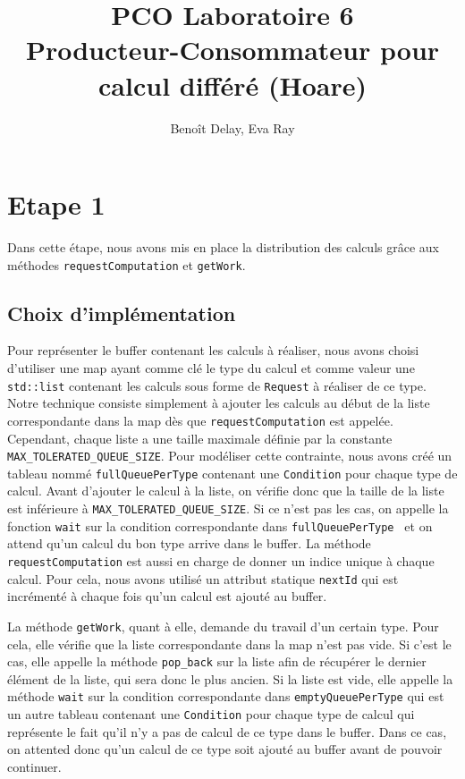 \documentclass{article}
\title{PCO Laboratoire 6 \\
\large Producteur-Consommateur pour calcul différé (Hoare)}
\author{Benoît Delay, Eva Ray}
\begin{document}
\maketitle

\section{Etape 1}
Dans cette étape, nous avons mis en place la distribution des calculs grâce aux méthodes \texttt{requestComputation} et
\texttt{getWork}.
\subsection{Choix d'implémentation}
Pour représenter le buffer contenant les calculs à réaliser, nous avons choisi d'utiliser une map ayant comme clé le
type du calcul et comme valeur une \texttt{std::list} contenant les calculs sous forme de \texttt{Request} à réaliser de
ce type.
Notre
technique consiste simplement à ajouter les calculs au début de la liste correspondante dans la map dès que
\texttt{requestComputation} est appelée.
Cependant, chaque liste a une taille maximale définie par la constante \texttt{MAX\_TOLERATED\_QUEUE\_SIZE}. Pour
modéliser cette contrainte, nous avons créé un tableau nommé \texttt{fullQueuePerType} contenant une \texttt{Condition}
pour chaque type de calcul.
Avant d'ajouter le calcul à la liste, on vérifie donc que la taille de la liste est inférieure à \texttt{MAX\_TOLERATED\_QUEUE\_SIZE}.
Si ce n'est pas les cas, on appelle la fonction \texttt{wait} sur la condition correspondante dans \texttt{fullQueuePerType
} et on attend qu'un calcul du bon type arrive dans le buffer.
La méthode \texttt{requestComputation} est aussi en charge de donner un indice unique à chaque calcul. Pour cela,
nous avons utilisé un attribut statique \texttt{nextId} qui est incrémenté à chaque fois qu'un calcul est ajouté au
buffer.


La méthode \texttt{getWork}, quant à elle, demande du travail d'un certain type. Pour cela, elle vérifie que la liste
correspondante dans la map n'est pas vide. Si c'est le cas, elle appelle la méthode \texttt{pop\_back} sur la liste
afin de récupérer le dernier élément de la liste, qui sera donc le plus ancien. Si la liste est vide, elle appelle la
méthode \texttt{wait} sur la condition correspondante dans \texttt{emptyQueuePerType} qui est un autre tableau
contenant une \texttt{Condition} pour chaque type de calcul qui représente le fait qu'il n'y a pas de calcul de ce
type dans le buffer. Dans ce cas, on attented donc qu'un calcul de ce type soit ajouté au buffer avant de pouvoir
continuer.
\end{document}
